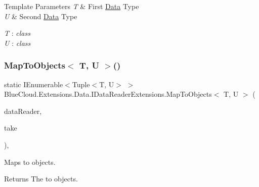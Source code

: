\begin{DoxyTemplParams}{Template Parameters}
{\em T} & First \mbox{\hyperlink{namespace_blue_cloud_1_1_extensions_1_1_data}{Data}} Type\\
\hline
{\em U} & Second \mbox{\hyperlink{namespace_blue_cloud_1_1_extensions_1_1_data}{Data}} Type\\
\hline
\end{DoxyTemplParams}
\begin{Desc}
\item[Type Constraints]\begin{description}
\item[{\em T} : {\em class}]\item[{\em U} : {\em class}]\end{description}
\end{Desc}
\mbox{\label{class_blue_cloud_1_1_extensions_1_1_data_1_1_i_data_reader_extensions_ac1ab442430a138f00d6845d5d7b30241}} 
\subsubsection{\texorpdfstring{Map\+To\+Objects$<$ T, U $>$()}{MapToObjects< T, U >()}\hspace{0.1cm}{\footnotesize\ttfamily [2/2]}}
{\footnotesize\ttfamily static I\+Enumerable$<$Tuple$<$T, U$>$ $>$ Blue\+Cloud.\+Extensions.\+Data.\+I\+Data\+Reader\+Extensions.\+Map\+To\+Objects$<$ T, U $>$ (\begin{DoxyParamCaption}\item[{this I\+Data\+Reader}]{data\+Reader,  }\item[{int}]{take }\end{DoxyParamCaption})\hspace{0.3cm}{\ttfamily [inline]}, {\ttfamily [static]}}



Maps to objects. 

\begin{DoxyReturn}{Returns}
The to objects.
\end{DoxyReturn}

